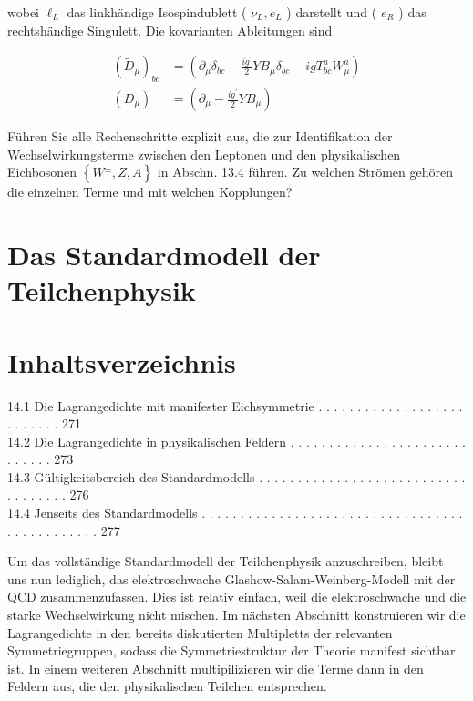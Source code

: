 \documentclass[10pt, letterpaper]{article}
\begin{document}
wobei $\ell_{L}$ das linkhändige Isospindublett ( $\nu_{L}, e_{L}$ ) darstellt und ( $e_{R}$ ) das rechtshändige Singulett. Die kovarianten Ableitungen sind

$$
\begin{aligned}
\left(\widetilde{D}_{\mu}\right)_{b c} & =\left(\partial_{\mu} \delta_{b c}-\frac{i g^{\prime}}{2} Y B_{\mu} \delta_{b c}-i g T_{b c}^{a} W_{\mu}^{a}\right) \\
\left(D_{\mu}\right) & =\left(\partial_{\mu}-\frac{i g^{\prime}}{2} Y B_{\mu}\right)
\end{aligned}
$$

Führen Sie alle Rechenschritte explizit aus, die zur Identifikation der Wechselwirkungsterme zwischen den Leptonen und den physikalischen Eichbosonen $\left\{W^{ \pm}, Z, A\right\}$ in Abschn. 13.4 führen. Zu welchen Strömen gehören die einzelnen Terme und mit welchen Kopplungen?

\section*{Das Standardmodell der Teilchenphysik}
\section*{Inhaltsverzeichnis}
14.1 Die Lagrangedichte mit manifester Eichsymmetrie . . . . . . . . . . . . . . . . . . . . . . . . . . 271\\
14.2 Die Lagrangedichte in physikalischen Feldern . . . . . . . . . . . . . . . . . . . . . . . . . . . . . 273\\
14.3 Gültigkeitsbereich des Standardmodells . . . . . . . . . . . . . . . . . . . . . . . . . . . . . . . . . . . 276\\
14.4 Jenseits des Standardmodells . . . . . . . . . . . . . . . . . . . . . . . . . . . . . . . . . . . . . . . . . . . . . . 277

Um das vollständige Standardmodell der Teilchenphysik anzuschreiben, bleibt uns nun lediglich, das elektroschwache Glashow-Salam-Weinberg-Modell mit der QCD zusammenzufassen. Dies ist relativ einfach, weil die elektroschwache und die starke Wechselwirkung nicht mischen. Im nächsten Abschnitt konstruieren wir die Lagrangedichte in den bereits diskutierten Multipletts der relevanten Symmetriegruppen, sodass die Symmetriestruktur der Theorie manifest sichtbar ist. In einem weiteren Abschnitt multipilizieren wir die Terme dann in den Feldern aus, die den physikalischen Teilchen entsprechen.
\end{document}
